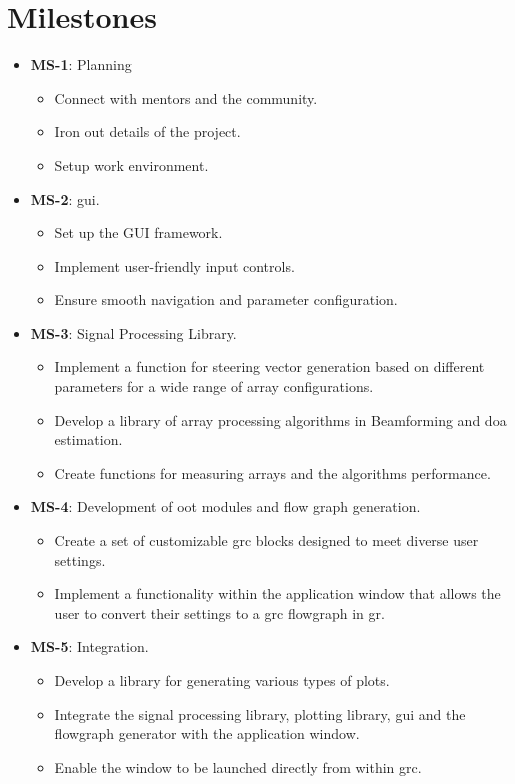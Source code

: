 \section{Milestones} \label{sec: milestones}

\begin{itemize}
	\item \textbf{MS-1}: Planning
	\begin{itemize}
		\item Connect with mentors and the community.
		\item Iron out details of the project.
		\item Setup work environment.
	\end{itemize}
	\item \textbf{MS-2}: \acf{gui}.
	\begin{itemize}
		\item Set up the GUI framework.
		\item Implement user-friendly input controls.
		\item Ensure smooth navigation and parameter configuration.
	\end{itemize}
	\item \textbf{MS-3}: Signal Processing Library.
	\begin{itemize}
		\item Implement a function for steering vector generation based on different parameters for a wide range of array configurations.
		\item Develop a library of array processing algorithms in Beamforming and \ac{doa} estimation.
		\item Create functions for measuring arrays and the algorithms performance.
	\end{itemize}
	\item \textbf{MS-4}: Development of \ac{oot} modules and flow graph generation.
	\begin{itemize}
		\item Create a set of customizable \ac{grc} blocks designed to meet diverse user settings.
		\item Implement a functionality within the application window that allows the user to convert their settings to a \ac{grc} flowgraph in \acl{gr}.
	\end{itemize}
		\item \textbf{MS-5}: Integration.
	\begin{itemize}
		\item Develop a library for generating various types of plots.
		\item Integrate the signal processing library, plotting library, \ac{gui} and the flowgraph generator with the application window.
		\item Enable the window to be launched directly from within \ac{grc}.
	\end{itemize}
\end{itemize}

